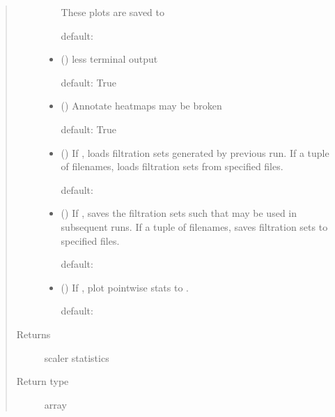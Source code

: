 \documentclass[letterpaper,10pt,openany,oneside,english]{sphinxmanual}
\begin{document}
\begin{fulllineitems}
\begin{quote}
\begin{description}
\begin{itemize}
These plots are saved to 

default: 


\item {} 
 (\sphinxstyleliteralemphasis{, }) \textendash{} 
less terminal output

default: True


\item {} 
 (\sphinxstyleliteralemphasis{, }) \textendash{} 
Annotate heatmaps \textendash{} may be broken

default: True


\item {} 
 (\sphinxstyleliteralemphasis{, }) \textendash{} 
If , loads filtration sets generated by previous run. If a
tuple of filenames, loads filtration sets from specified files.

default: 


\item {} 
 (\sphinxstyleliteralemphasis{, }) \textendash{} 
If , saves the filtration sets such that 
may     be used in subsequent runs. If a tuple of filenames, saves
filtration sets to specified files.

default: 


\item {} 
 (\sphinxstyleliteralemphasis{, }) \textendash{} 
If , plot pointwise stats to .

default: 


\end{itemize}

\item[{Returns}] \leavevmode
scaler statistics

\item[{Return type}] \leavevmode
array

\end{description}\end{quote}

\end{fulllineitems}
\end{document}
